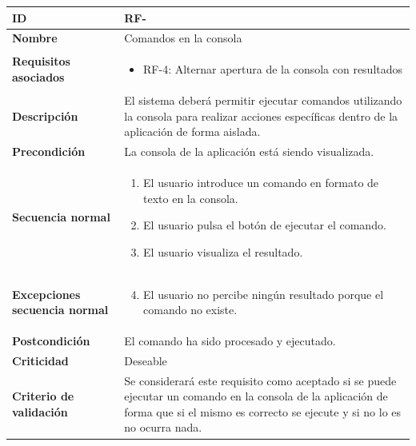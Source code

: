 \begin{center}
	\begin{tabular}{ | p{4.7cm} | p{10cm} | } 
		\hline
		
		\textbf{ID} & RF-\arabic{contador_requisitos_funcionales}
		{contador_requisitos_funcionales} \\
		
		\hline 
		\textbf{Nombre} &
		Comandos en la consola\\ 
		
		\hline
		\textbf{Requisitos asociados} & 
		\begin{itemize}
			\item RF-4: Alternar apertura de la consola con resultados
		\end{itemize}\\
		
		\hline
		\textbf{Descripción} & 
		El sistema deberá permitir ejecutar comandos utilizando la consola para realizar acciones específicas dentro de la aplicación de forma aislada.\\
		
		\hline
		\textbf{Precondición} & 
		La consola de la aplicación está siendo visualizada.\\
		
		\hline
		\textbf{Secuencia normal} &
		\begin{enumerate}
			\item El usuario introduce un comando en formato de texto en la consola.
			\item El usuario pulsa el botón de ejecutar el comando.
			\item El usuario visualiza el resultado.
		\end{enumerate}
		\\
		
		\hline
		\textbf{Excepciones secuencia normal} &
		\begin{enumerate}
			\setcounter{enumi}{3}
			\item El usuario no percibe ningún resultado porque el comando no existe.
		\end{enumerate}
		\\
		
		\hline
		\textbf{Postcondición} & 
		El comando ha sido procesado y ejecutado.\\
		
		\hline 
		\textbf{Criticidad} &
		Deseable\\
		
		\hline 
		\textbf{Criterio de validación} & 
		Se considerará este requisito como aceptado si se puede ejecutar un comando en la consola de la aplicación de forma que si el mismo es correcto se ejecute y si no lo es no ocurra nada.\\
		
		\hline
	\end{tabular}
\end{center}


